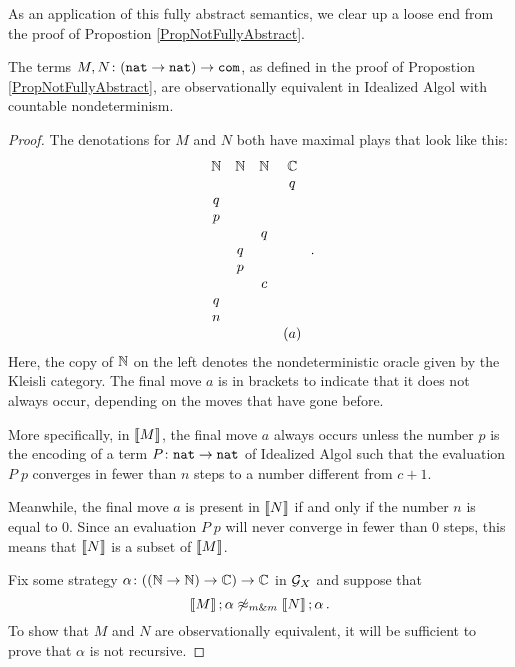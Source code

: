 \documentclass{article}
\begin{document}
As an application of this fully abstract semantics, we clear up a loose end from the proof of Propostion \ref{PropNotFullyAbstract}.

\begin{lemma}
  The terms $M,N\colon ({\mathtt{nat}} \to {\mathtt{nat}}) \to {\mathtt{com}}$, as defined in the proof of Propostion \ref{PropNotFullyAbstract}, are observationally equivalent in Idealized Algol with countable nondeterminism.
\end{lemma}
\begin{proof}
  The denotations for $M$ and $N$ both have maximal plays that look like this:
  \[
    \begin{array}{cccc}
      \mathbb{N} & \mathbb{N} & \mathbb{N} & \mathbb{C} \\
          &     &     &  q  \\
       q  &     &     &     \\
       p  &     &     &     \\
          &     &  q  &     \\
          &  q  &     &     \\
          &  p  &     &     \\
          &     &  c  &     \\
       q  &     &     &     \\
       n  &     &     &     \\
          &     &     & (a)
    \end{array}\,.
    \]
  Here, the copy of $\mathbb{N}$ on the left denotes the nondeterministic oracle given by the Kleisli category.  
  The final move $a$ is in brackets to indicate that it does not always occur, depending on the moves that have gone before.

  More specifically, in $\left\llbracket M\right\rrbracket$, the final move $a$ always occurs unless the number $p$ is the encoding of a term $P\colon{\mathtt{nat}} \to {\mathtt{nat}}$ of Idealized Algol such that the evaluation $P\;p$ converges in fewer than $n$ steps to a number different from $c+1$.

  Meanwhile, the final move $a$ is present in $\left\llbracket N\right\rrbracket$ if and only if the number $n$ is equal to $0$.
  Since an evaluation $P\;p$ will never converge in fewer than $0$ steps, this means that $\left\llbracket N\right\rrbracket$ is a subset of $\left\llbracket M\right\rrbracket$.

  Fix some strategy $\alpha\colon ((\mathbb{N} \to \mathbb{N})\to\mathbb{C}) \to \mathbb{C}$ in $\mathcal G_X$ and suppose that
  \[
    \left\llbracket M\right\rrbracket;\alpha\not\mathrel{\approx_{m\&m}} \left\llbracket N\right\rrbracket;\alpha\,.
    \]
  To show that $M$ and $N$ are observationally equivalent, it will be sufficient to prove that $\alpha$ is not recursive.


\end{proof}
\end{document}
